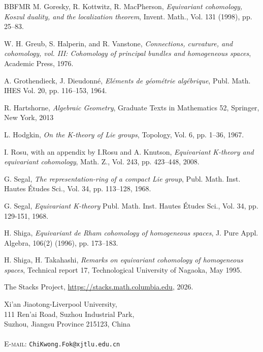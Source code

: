 \documentclass[11pt]{amsart}
\theoremstyle{plain}
\theoremstyle{definition}
\begin{document}
\begin{thebibliography}{BBFMR}
	M. Goresky, R. Kottwitz, R. MacPherson, 
	\emph{Equivariant cohomology, Koszul duality, and
the localization theorem}, Invent. Math., Vol. 131 (1998), pp. 25--83.

	W. H. Greub, S. Halperin, and R. Vanstone,  
	\emph{Connections, curvature, and cohomology, vol. III:
Cohomology of principal bundles and homogeneous spaces}, Academic Press, 1976.	

	A. Grothendieck, J. Dieudonn\'e, 
	\emph{El\'ements de g\'eom\'etrie alg\'ebrique}, 
	Publ. Math. IHES Vol. 20, pp. 116--153, 1964.
	

	R. Hartshorne, 
	\emph{Algebraic Geometry}, 
	Graduate Texts in Mathematics 52, Springer, New York, 2013
			
	L. Hodgkin, 
	\emph{On the K-theory of Lie groups}, 
	Topology, Vol. 6, pp. 1--36, 1967. 
	
	 I. Rosu, with an appendix by I.Rosu and A. Knutson, \textit{Equivariant K-theory and equivariant cohomology}, Math. Z., Vol. 243, pp. 423--448, 2008.
	 	
	G. Segal, 
	\emph{The representation-ring of a compact Lie group}, 
	Publ. Math. Inst. Hautes \'Etudes Sci., Vol. 34, pp. 113--128, 1968.
	
	G. Segal, 
	\emph{Equivariant K-theory}
	Publ. Math. Inst. Hautes \'Etudes Sci., Vol. 34, pp. 129-151, 1968.
	
	H. Shiga, \textit{Equivariant de Rham cohomology of homogeneous spaces}, J. Pure Appl. Algebra, 106(2) (1996), pp. 173--183.
	
	H. Shiga, H. Takahashi, \textit{Remarks on equivariant cohomology of homogeneous spaces}, Technical
report 17, Technological University of Nagaoka, May 1995.

	The Stacks Project, \url{https://stacks.math.columbia.edu}, 2026.
		
	\end{thebibliography}
	\noindent\footnotesize{\textsc Xi'an Jiaotong-Liverpool University,\\
111 Ren’ai Road, Suzhou Industrial
Park,\\Suzhou, Jiangsu Province 215123, China}\\
\\
\textsc{E-mail}: \texttt{ChiKwong.Fok@xjtlu.edu.cn}\\
\end{document}
